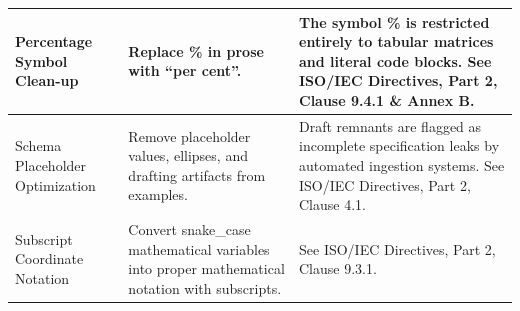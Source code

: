 \documentclass[11pt,a4paper]{article}
\begin{document}
\begin{table}[h]
\begin{tabular}{|l|l|l|}
Percentage Symbol Clean-up & Replace \% in prose with “per cent”. & The symbol \% is restricted entirely to tabular matrices and literal code blocks. See ISO/IEC Directives, Part 2, Clause 9.4.1 \& Annex B. \\ \hline
Schema Placeholder Optimization & Remove placeholder values, ellipses, and drafting artifacts from examples. & Draft remnants are flagged as incomplete specification leaks by automated ingestion systems. See ISO/IEC Directives, Part 2, Clause 4.1. \\ \hline
Subscript Coordinate Notation & Convert snake\_case mathematical variables into proper mathematical notation with subscripts. & See ISO/IEC Directives, Part 2, Clause 9.3.1. \\ \hline
\end{tabular}
\end{table}
\end{document}
